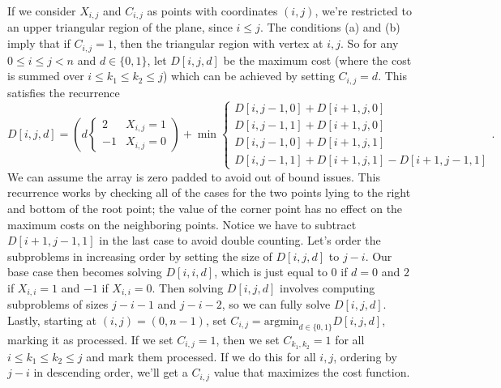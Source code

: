 \documentclass[11pt,letterpaper]{article}
\begin{document}
\begin{solution}
    If we consider $X_{i,j}$ and $C_{i,j}$ as points with coordinates $(i,j)$, we're restricted to an upper triangular region of the plane, since $i\leq j$. The conditions (a) and (b) imply that if $C_{i,j}=1$, then the triangular region with vertex at $i,j$. So for any $0\leq i\leq j<n$ and $d\in \{0,1\}$, let $D[i,j,d]$ be the maximum cost (where the cost is summed over $i\leq k_1 \leq k_2 \leq j$) which can be achieved by setting $C_{i,j}=d$. This satisfies the recurrence
    \[
        D[i,j,d] = \left(d\begin{cases}
            2 & X_{i,j}=1\\ -1 & X_{i,j}=0
        \end{cases}\right)+\min \begin{cases}
            D[i,j-1,0] + D[i+1,j,0]\\ 
            D[i,j-1,1] + D[i+1,j,0]\\ 
            D[i,j-1,0] + D[i+1,j,1]\\
            D[i,j-1,1] + D[i+1,j,1] - D[i+1,j-1,1]
        \end{cases}
    .\]
    We can assume the array is zero padded to avoid out of bound issues. This recurrence works by checking all of the cases for the two points lying to the right and bottom of the root point; the value of the corner point has no effect on the maximum costs on the neighboring points. Notice we have to subtract $D[i+1,j-1,1]$ in the last case to avoid double counting. Let's order the subproblems in increasing order by setting the size of $D[i,j,d]$ to $j-i$. Our base case then becomes solving $D[i,i,d]$, which is just equal to $0$ if $d=0$ and $2$ if $X_{i,i}=1$ and $-1$ if $X_{i,i}=0$. Then solving $D[i,j,d]$ involves computing subproblems of sizes $j-i-1$ and $j-i-2$, so we can fully solve $D[i,j,d]$. Lastly, starting at $(i,j)=(0,n-1)$, set $C_{i,j}=\mathrm{argmin}_{d\in \{0,1\}} D[i,j,d]$, marking it as processed. If we set $C_{i,j}=1$, then we set $C_{k_1,k_2}=1$ for all $i\leq k_1\leq k_2\leq j$ and mark them processed. If we do this for all $i,j$, ordering by $j-i$ in descending order, we'll get a $C_{i,j}$ value that maximizes the cost function.
    
\end{solution}
\end{document}
